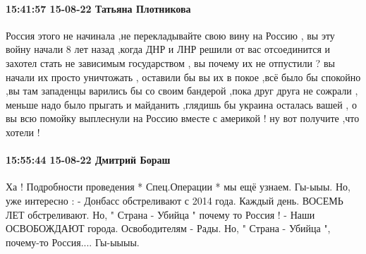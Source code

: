  
 
 
 
 

\paragraph{15:41:57 15-08-22 Татьяна Плотникова}

Россия этого не начинала ,не перекладывайте свою вину на Россию , вы эту войну
начали 8 лет назад ,когда ДНР и ЛНР решили от вас отсоединится и захотел стать
не зависимым государством , вы почему их не отпустили ? вы начали их просто
уничтожать , оставили бы вы их в покое ,всё было бы спокойно ,вы там западенцы
варились бы со своим бандерой ,пока друг друга не сожрали , меньше надо было
прыгать и майданить ,глядишь бы украина осталась вашей , о вы всю помойку
выплеснули на Россию вместе с америкой ! ну вот получите ,что хотели !

\paragraph{15:55:44 15-08-22 Дмитрий Бораш}

Ха !   Подробности проведения * Спец.Операции * мы ещё узнаем.   Гы-ыыы. 
Но, уже интересно : 
- Донбасс обстреливают с 2014 года.   Каждый день.  ВОСЕМЬ ЛЕТ обстреливают.  
Но, " Страна - Убийца " почему то Россия !    
- Наши ОСВОБОЖДАЮТ города.  Освободителям - Рады.     Но, " Страна - Убийца ", почему-то Россия....       Гы-ыыыы.
